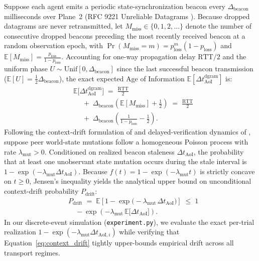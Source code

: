\documentclass[11pt]{article}
\begin{document}
Suppose each agent emits a periodic state-synchronization beacon every $\Delta_{\mathrm{beacon}}$ milliseconds over Plane~2 (RFC 9221 Unreliable Datagrams \citep{pauly2022rfc9221}). Because dropped datagrams are never retransmitted, let $M_{\mathrm{miss}} \allowbreak \in \{0,\allowbreak 1,\allowbreak 2,\allowbreak \dots\}$ denote the number of consecutive dropped beacons preceding the most recently received beacon at a random observation epoch, with $\Pr(M_{\mathrm{miss}} = m) = p_{\mathrm{loss}}^m (1 - p_{\mathrm{loss}})$ and $\mathbb{E}[M_{\mathrm{miss}}] = \frac{p_{\mathrm{loss}}}{1 - p_{\mathrm{loss}}}$. Accounting for one-way propagation delay $\mathrm{RTT}/2$ and the uniform phase $U \sim \mathrm{Unif}[0,\allowbreak \Delta_{\mathrm{beacon}}]$ since the last successful beacon transmission ($\mathbb{E}[U] = \frac{1}{2}\Delta_{\mathrm{beacon}}$), the exact expected Age of Information $\mathbb{E}[\Delta t_{\mathrm{AoI}}^{\mathrm{dgram}}]$ is:
\begin{equation}
\begin{aligned}
&\mathbb{E}\bigl[\Delta t_{\mathrm{AoI}}^{\mathrm{dgram}}\bigr] \;=\; \frac{\mathrm{RTT}}{2} \\
&\quad \;+\; \Delta_{\mathrm{beacon}}\!\left(\mathbb{E}[M_{\mathrm{miss}}] + \frac{1}{2}\right) \;=\; \frac{\mathrm{RTT}}{2} \\
&\quad \;+\; \Delta_{\mathrm{beacon}}\!\left(\frac{1}{1 - p_{\mathrm{loss}}} - \frac{1}{2}\right).
\end{aligned}
\label{eq:aoi_dgram}
\end{equation}
Following the context-drift formulation of \citet{rodrigues2026drift} and delayed-verification dynamics of \citet{itkin2026delayed}, suppose peer world-state mutations follow a homogeneous Poisson process with rate $\lambda_{\mathrm{mut}} > 0$. Conditioned on realized beacon staleness $\Delta t_{\mathrm{AoI}}$, the probability that at least one unobservant state mutation occurs during the stale interval is $1 - \exp(-\lambda_{\mathrm{mut}} \Delta t_{\mathrm{AoI}})$. Because $f(t) = 1 - \exp(-\lambda_{\mathrm{mut}} t)$ is strictly concave on $t \ge 0$, Jensen's inequality yields the analytical upper bound on unconditional context-drift probability $P_{\mathrm{drift}}$:
\begin{equation}
\begin{aligned}
&P_{\mathrm{drift}} \;=\; \mathbb{E}\!\left[1 - \exp\bigl(-\lambda_{\mathrm{mut}}\, \Delta t_{\mathrm{AoI}}\bigr)\right] \;\le\; 1 \\
&\quad - \exp\!\left(-\lambda_{\mathrm{mut}}\, \mathbb{E}\bigl[\Delta t_{\mathrm{AoI}}\bigr]\right).
\end{aligned}
\label{eq:context_drift}
\end{equation}
In our discrete-event simulation (\texttt{experiment.\linebreak[0]py}), we evaluate the exact per-trial realization $1 - \exp(-\lambda_{\mathrm{mut}} \Delta t_{\mathrm{AoI}, i})$ while verifying that Equation~\eqref{eq:context_drift} tightly upper-bounds empirical drift across all transport regimes.
\end{document}
